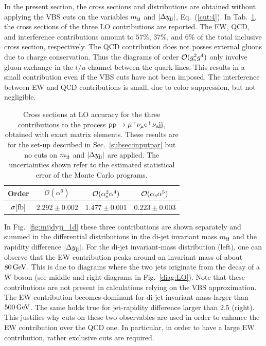 In the present section, the cross sections and distributions are obtained without applying the VBS cuts on the variables $m_{\text{j}\text{j}}$ and $|\Delta y_{\text{j}\text{j}}|$, 
Eq.~(\ref{cut:4}).
In Tab.~\ref{tab:LOscanXsec}, the cross sections of the three LO contributions are reported.
The EW, QCD, and interference contributions amount to $57\%$, $37\%$, and $6\%$ of the total inclusive cross section, respectively.
The QCD contribution does not posses external gluons due to charge conservation.
Thus the diagrams of order $\mathcal{O}(g_{\rm s}^2g^4)$ only involve gluon exchange in the $t/u$-channel between the quark lines.
This results in a small contribution even if the VBS cuts have not been imposed.
The interference between EW and QCD contributions is small, due to color suppression, but not negligible.

\begin{table}[h!]
    \centering
    \begin{tabular}{c|c|c|c}
        Order & $\mathcal{O}(\alpha^6)$ & $\mathcal{O}(\alpha_\text{s}^2\alpha^4)$ & $\mathcal{O}(\alpha_\text{s}\alpha^5)$ \\
        \hline
        \hline
        $\sigma[\rm{fb}]$ & $ 2.292 \pm 0.002 $ & $ 1.477 \pm 0.001 $ & $ 0.223 \pm 0.003 $ \\
    \end{tabular}
    \caption{\label{tab:LOscanXsec} Cross sections at LO accuracy for the three contributions to the process ${\rm p}{\rm p}\to\mu^+\nu_\mu{\rm e}^+\nu_{\rm e}{\rm j}{\rm j}$, obtained with exact matrix elements.
    These results are for the set-up described in Sec.~\ref{subsec:inputpar} but no cuts on $m_{\text{j}\text{j}}$ and $|\Delta y_{\text{j}\text{j}}|$ are applied.
    The uncertainties shown refer to the estimated statistical error of the Monte Carlo programs.}
\end{table}

In Fig.~\ref{fig:mjjdyjj_1d} these three contributions are shown separately and summed in the differential distributions in the di-jet invariant mass $m_{\text{j}\text{j}}$ and the rapidity difference $|\Delta y_{\text{j}\text{j}}|$.
For the di-jet invariant-mass distribution (left), one can observe that the EW contribution peaks around an invariant mass of about $80\,\text{GeV}$.
This is due to diagrams where the two jets originate from the decay of a W boson (see middle and right diagrams in Fig.~\ref{diag:LO}).
Note that these contributions are not present in calculations relying on the VBS approximation.
The EW contribution becomes dominant for di-jet invariant mass larger than $500\,\text{GeV}$.
The same holds true for jet-rapidity difference larger than $2.5$ (right).
This justifies why cuts on these two observables are used in order to enhance the EW contribution over the QCD one.
In particular, in order to have a large EW contribution, rather exclusive cuts are required.


